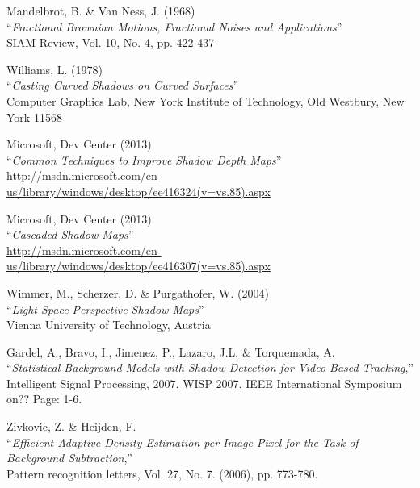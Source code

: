 \begin{thebibliography}{9}

	Mandelbrot, B. \& Van Ness, J. (1968) \\ 
	``\textit{Fractional Brownian Motions, Fractional Noises and Applications}'' \\
	SIAM Review, Vol. 10, No. 4, pp. 422-437
	
	Williams, L. (1978) \\ 
	``\textit{Casting Curved Shadows on Curved Surfaces}'' \\
	Computer Graphics Lab, New York Institute of Technology, Old Westbury, New York 11568 
	
	Microsoft, Dev Center (2013) \\ 
	``\textit{Common Techniques to Improve Shadow Depth Maps}'' \\
	\href{http://msdn.microsoft.com/en-us/library/windows/desktop/ee416324(v=vs.85).aspx}{http://msdn.microsoft.com/en-us/library/windows/desktop/ee416324(v=vs.85).aspx}
	
	Microsoft, Dev Center (2013) \\ 
	``\textit{Cascaded Shadow Maps}'' \\
	\href{http://msdn.microsoft.com/en-us/library/windows/desktop/ee416307(v=vs.85).aspx}{http://msdn.microsoft.com/en-us/library/windows/desktop/ee416307(v=vs.85).aspx}
	
	Wimmer, M., Scherzer, D. \& Purgathofer, W. (2004) \\ 
	``\textit{Light Space Perspective Shadow Maps}'' \\
	Vienna University of Technology, Austria \\

	

	Gardel, A., Bravo, I., Jimenez, P., Lazaro, J.L. \& Torquemada, A.\\
	``\textit{Statistical Background Models with Shadow Detection for Video Based Tracking},''\\ Intelligent Signal Processing, 2007. WISP 2007. IEEE International Symposium on?? Page: 1-6.
	
	Zivkovic, Z. \& Heijden, F.\\
	``\textit{Efficient Adaptive Density Estimation per Image Pixel for the Task of Background Subtraction},''\\
	Pattern recognition letters, Vol. 27, No. 7. (2006), pp. 773-780.


\end{thebibliography}
